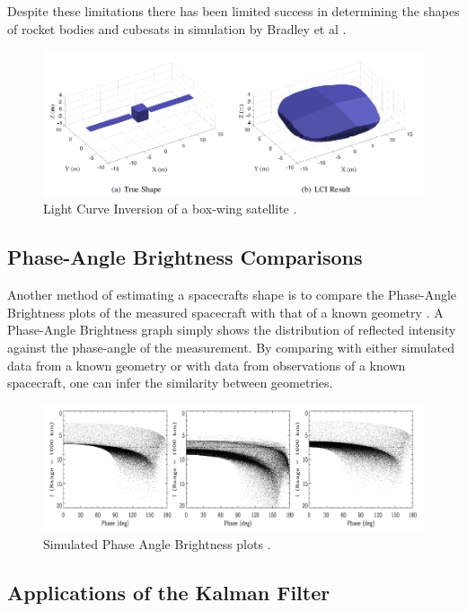 \documentclass{article}
\begin{document}
Despite these limitations there has been limited success in determining the shapes of rocket bodies and cubesats in simulation by Bradley et al \cite{Bradley2014LIGHTCURVEIF}.

\begin{figure}[h]
	\centering
	\includegraphics[width=1\textwidth]{lci_LIGHTCURVE_INVERSION}
	\caption{Light Curve Inversion of a box-wing satellite \cite{Bradley2014LIGHTCURVEIF}.}
\end{figure}

\subsection{Phase-Angle Brightness Comparisons}

Another method of estimating a spacecrafts shape is to compare the Phase-Angle Brightness plots of the measured spacecraft with that of a known geometry \cite{Separating}. A Phase-Angle Brightness graph simply shows the distribution of reflected intensity against the phase-angle of the measurement. By comparing with either simulated data from a known geometry or with data from observations of a known spacecraft, one can infer the similarity between geometries.

\begin{figure}[h]
	\centering
	\includegraphics[width=\textwidth]{phase_angle_brightness_SEPARATING_ATTITUDE}
	\caption{Simulated Phase Angle Brightness plots \cite{Separating}.}
\end{figure}

\subsection{Applications of the Kalman Filter}
\end{document}
